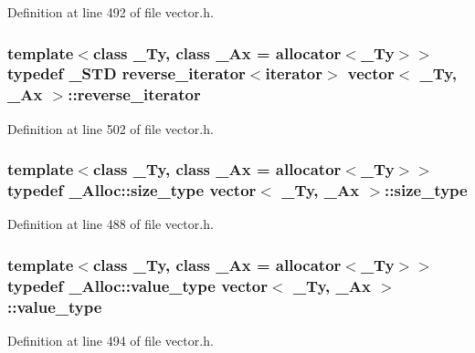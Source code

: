 Definition at line 492 of file vector.\+h.

\hypertarget{classvector_a40def3e50f68e742f5b0cc571eaf51eb}{
\subsubsection[{reverse\+\_\+iterator}]{\setlength{\rightskip}{0pt plus 5cm}template$<$class \+\_\+\+Ty, class \+\_\+\+Ax = allocator$<$\+\_\+\+Ty$>$$>$ typedef \+\_\+\+S\+T\+D {\bf reverse\+\_\+iterator}$<${\bf iterator}$>$ {\bf vector}$<$ \+\_\+\+Ty, \+\_\+\+Ax $>$\+::{\bf reverse\+\_\+iterator}}}\label{classvector_a40def3e50f68e742f5b0cc571eaf51eb}


Definition at line 502 of file vector.\+h.

\hypertarget{classvector_ac975e84f5d6c2fe2267bb354a85818af}{
\subsubsection[{size\+\_\+type}]{\setlength{\rightskip}{0pt plus 5cm}template$<$class \+\_\+\+Ty, class \+\_\+\+Ax = allocator$<$\+\_\+\+Ty$>$$>$ typedef \+\_\+\+Alloc\+::size\+\_\+type {\bf vector}$<$ \+\_\+\+Ty, \+\_\+\+Ax $>$\+::{\bf size\+\_\+type}}}\label{classvector_ac975e84f5d6c2fe2267bb354a85818af}


Definition at line 488 of file vector.\+h.

\hypertarget{classvector_acb600d25126cc0f3871b5a73f840acad}{
\subsubsection[{value\+\_\+type}]{\setlength{\rightskip}{0pt plus 5cm}template$<$class \+\_\+\+Ty, class \+\_\+\+Ax = allocator$<$\+\_\+\+Ty$>$$>$ typedef \+\_\+\+Alloc\+::value\+\_\+type {\bf vector}$<$ \+\_\+\+Ty, \+\_\+\+Ax $>$\+::{\bf value\+\_\+type}}}\label{classvector_acb600d25126cc0f3871b5a73f840acad}


Definition at line 494 of file vector.\+h.



